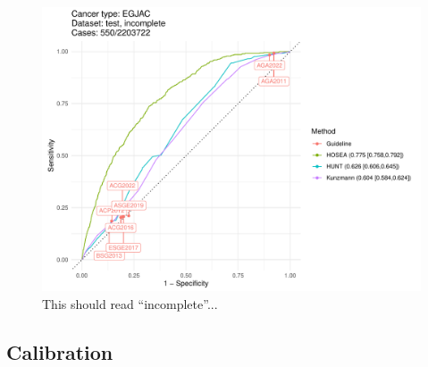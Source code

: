 \documentclass[12pt]{article}
\begin{document}
\begin{figure}[ht]
\includegraphics[width=1.0\linewidth]{comparison/EGJAC_incomplete.pdf}
\caption{This should read ``incomplete''...}
\end{figure}


\newpage
\clearpage
\subsection{Calibration}
\end{document}
